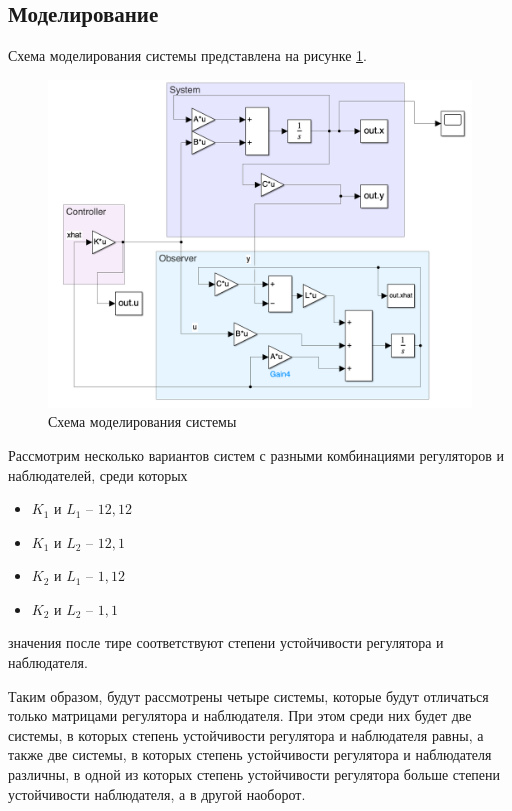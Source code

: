 \subsection{Моделирование}
Схема моделирования системы представлена на рисунке \ref{fig:task2_1_scheme}.
\begin{figure}[hb!]
    \centering
    \includegraphics[width=\textwidth]{media/scheme2.png}
    \caption{Схема моделирования системы}
    \label{fig:task2_1_scheme}
\end{figure}

Рассмотрим несколько вариантов систем с разными комбинациями регуляторов и наблюдателей, среди которых 
\begin{itemize}
    \item $K_1$ и $L_1$ -- $12, 12$
    \item $K_1$ и $L_2$ -- $12, 1$
    \item $K_2$ и $L_1$ -- $1, 12$
    \item $K_2$ и $L_2$ -- $1, 1$
\end{itemize}
значения после тире соответствуют степени устойчивости регулятора и наблюдателя.

Таким образом, будут рассмотрены четыре системы, которые будут отличаться только матрицами регулятора и наблюдателя.
При этом среди них будет две системы, в которых степень устойчивости регулятора и наблюдателя равны, 
а также две системы, в которых степень устойчивости регулятора и наблюдателя различны, в одной из которых
степень устойчивости регулятора больше степени устойчивости наблюдателя, а в другой наоборот.


